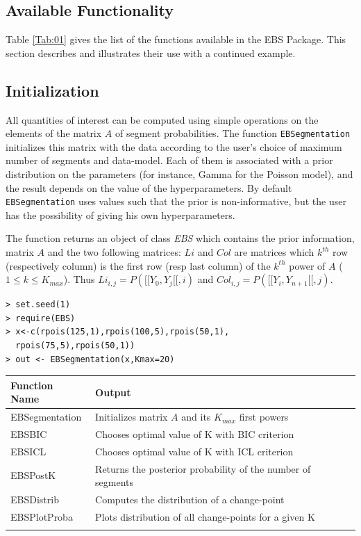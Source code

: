 \documentclass{bioinfo}
\begin{document}
\begin{methods}

\section{Available Functionality}

Table \ref{Tab:01} gives the list of the functions available in the EBS Package. This section describes and illustrates their use with a continued example. 

\subsection{Initialization}

All quantities of interest can be computed using simple operations on the elements of the matrix $A$ of segment probabilities. The function \texttt{EBSegmentation} initializes this matrix with the data according to the user's choice of maximum number of segments and data-model. Each of them is associated with a prior distribution on the parameters (for instance, Gamma for the Poisson model), and the result depends on the value of the hyperparameters. By default \texttt{EBSegmentation} uses values such that the prior is non-informative, but the user has the possibility of giving his own hyperparameters.

The function returns an object of class \textit{EBS} which contains the prior information, matrix $A$ and the two following matrices: $Li$ and $Col$ are matrices which $k^{th}$ row (respectively column) is the first row (resp last column) of the $k^{th}$ power of $A$ ($1\leq k \leq K_{max}$). Thus $Li_{i,j}=P([\![Y_0,Y_j[\![,i)$ and $Col_{i,j}=P([\![Y_i,Y_{n+1}[\![,j)$.

\begin{verbatim}
> set.seed(1)
> require(EBS)
> x<-c(rpois(125,1),rpois(100,5),rpois(50,1),
  rpois(75,5),rpois(50,1))
> out <- EBSegmentation(x,Kmax=20)
\end{verbatim}


\begin{table}[!t]
{\begin{tabular}{ll}\toprule
Function Name & Output \\\midrule
 EBSegmentation & Initializes matrix $A$ and its $K_{max}$ first powers\\
 EBSBIC & Chooses optimal value of K with BIC criterion\\
 EBSICL & Chooses optimal value of K with ICL criterion\\ 
 EBSPostK & Returns the posterior probability of the number of segments\\
 EBSDistrib & Computes the distribution of a change-point\\
 EBSPlotProba & Plots distribution of all change-points for a given K\\\botrule
\end{tabular}}{}
\end{table}





\end{methods}
\end{document}
